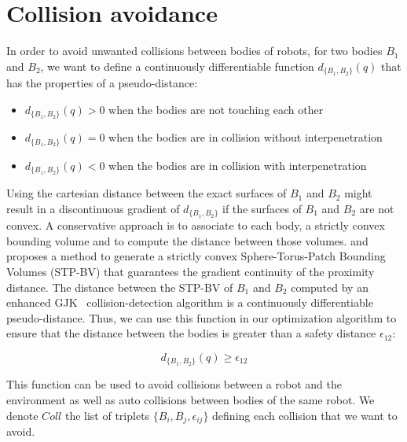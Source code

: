 \section{Collision avoidance}
\label{sec:collision_avoidance}


In order to avoid unwanted collisions between bodies of robots, for two bodies $B_1$ and $B_2$, we want to define a continuously differentiable function $d_{\{B_1, B_2\}}(q)$ that has the properties of a pseudo-distance:
\begin{itemize}
  \item $d_{\{B_1, B_2\}}(q) > 0$ when the bodies are not touching each other
  \item $d_{\{B_1, B_2\}}(q) = 0$ when the bodies are in collision without interpenetration
  \item $d_{\{B_1, B_2\}}(q) < 0$ when the bodies are in collision with interpenetration
\end{itemize}

Using the cartesian distance between the exact surfaces of $B_1$ and $B_2$ might result in a discontinuous gradient of $d_{\{B_1, B_2\}}$ if the surfaces of $B_1$ and $B_2$ are not convex.
A conservative approach is to associate to each body, a strictly convex bounding volume and to compute the distance between those volumes.
\cite{escande:humanoids:2007} and~\cite{escande:itro:2014} proposes a method to generate a strictly convex Sphere-Torus-Patch Bounding Volumes (STP-BV) that guarantees the gradient continuity of the proximity distance.
The distance between the STP-BV of $B_1$ and $B_2$ computed by an enhanced GJK~\cite{gilbert-1988a} collision-detection algorithm is a continuously differentiable pseudo-distance.
Thus, we can use this function in our optimization algorithm to ensure that the distance between the bodies is greater than a safety distance $\epsilon_{12}$:

\begin{equation}
  \boxed{d_{\{B_1, B_2\}}(q) \geq \epsilon_{12}}
\end{equation}

This function can be used to avoid collisions between a robot and the environment as well as auto collisions between bodies of the same robot.
We denote $Coll$ the list of triplets $\{B_i, B_j, \epsilon_{ij}\}$ defining each collision that we want to avoid.

